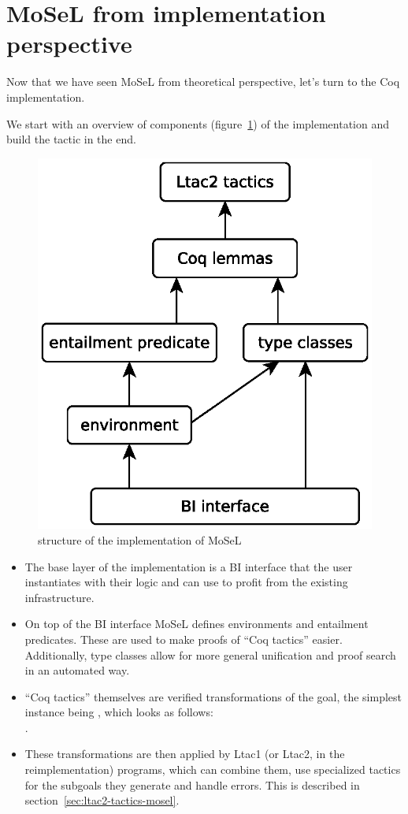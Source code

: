 \section{MoSeL from implementation perspective}
\label{sec:implementation-of-ipm}

Now that we have seen MoSeL from theoretical perspective, let's turn to the Coq implementation.

We start with an overview of components (figure~\ref{fig:ipm-diagram}) of the implementation and build the  tactic in the end.

\begin{figure}
  \centering
  \includegraphics[width=0.5\linewidth]{ipm-diagram}
  \caption{structure of the implementation of MoSeL}
  \label{fig:ipm-diagram}
\end{figure}


\begin{itemize}
\item The base layer of the implementation is a BI interface that the user instantiates with their logic and can use to profit from the existing infrastructure.
\item On top of the BI interface MoSeL defines environments and entailment predicates. These are used to make proofs of ``Coq tactics'' easier.
  Additionally, type classes allow for more general unification and proof search in an automated way.
\item ``Coq tactics'' themselves are verified transformations of the goal, the simplest instance being , which looks as follows:\\
.
\item These transformations are then applied by Ltac1 (or Ltac2, in the reimplementation) programs, which can combine them, use specialized tactics for the subgoals they generate and handle errors.
  This is described in section~\ref{sec:ltac2-tactics-mosel}.
\end{itemize}

